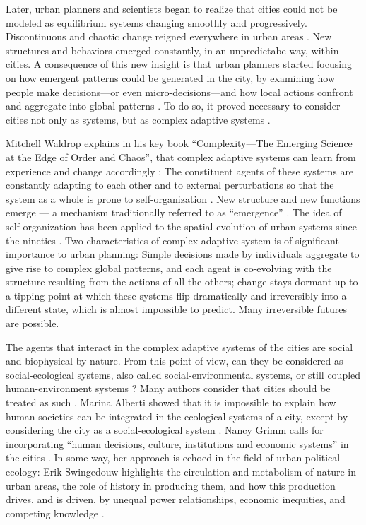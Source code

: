 \documentclass[10pt,a4paper]{article}
\begin{document}
\begin{multicols}{2}
Later, urban planners and scientists began to realize that cities could not be modeled as equilibrium systems changing smoothly and progressively. Discontinuous and chaotic change reigned everywhere in urban areas \citep{r82}. New structures and behaviors emerged constantly, in an unpredictabe way, within cities. A consequence of this new insight is that urban planners started focusing on how emergent patterns could be generated in the city, by examining how people make decisions---or even micro-decisions---and how local actions confront and aggregate into global patterns \citep{r83, r84}. To do so, it proved necessary to consider cities not only as systems, but as complex adaptive systems \citep{r85, r86}.

Mitchell Waldrop explains in his key book ``Complexity---The Emerging Science at the Edge of Order and Chaos'', that complex adaptive systems can learn from experience and change accordingly \citep{r87}: The constituent agents of these systems are constantly adapting to each other and to external perturbations so that the system as a whole is prone to self-organization \citep{r88}. New structure and new functions emerge — a mechanism traditionally referred to as ``emergence'' \citep{r89}. The idea of self-organization has been applied to the spatial evolution of urban systems since the nineties \citep{r90, r91}. Two characteristics of complex adaptive system is of significant importance to urban planning: Simple decisions made by individuals aggregate to give rise to complex global patterns, and each agent is co-evolving with the structure resulting from the actions of all the others; change stays dormant up to a tipping point at which these systems flip dramatically and irreversibly into a different state, which is almost impossible to predict. Many irreversible futures are possible.  

The agents that interact in the complex adaptive systems of the cities are social and biophysical by nature. From this point of view, can they be considered as social-ecological systems, also called social-environmental systems, or still coupled human-environment systems \citep{r92}? Many authors consider that cities should be treated as such \citep{r93, r94}. Marina Alberti showed that it is impossible to explain how human societies can be integrated in the ecological systems of a city, except by considering the city as a social-ecological system \citep{r95}. Nancy Grimm calls for incorporating ``human decisions, culture, institutions and economic systems'' in the cities \citep{r96}. In some way, her approach is echoed in the field of urban political ecology: Erik Swingedouw highlights the circulation and metabolism of nature in urban areas, the role of history in producing them, and how this production drives, and is driven, by unequal power relationships, economic inequities, and competing knowledge \citep{r97}.


\end{multicols}
\end{document}
